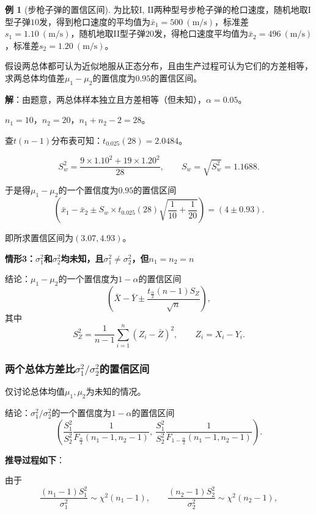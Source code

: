 \documentclass[11pt,a4paper]{report}
\theoremstyle{definition}
\newtheorem{example}{例}[chapter]
\begin{document}
\begin{example}[步枪子弹的置信区间]
为比较I, II两种型号步枪子弹的枪口速度，随机地取I型子弹$10$发，得到枪口速度的平均值为$\bar{x}_{1}=500\ (\text{m/s})$，标准差$s_{1}=1.10\ (\text{m/s})$，随机地取II型子弹$20$发，得枪口速度平均值为$\bar{x}_{2}=496\ (\text{m/s})$，标准差$s_{2}=1.20\ (\text{m/s})$。

假设两总体都可认为近似地服从正态分布，且由生产过程可认为它们的方差相等，求两总体均值差$\mu_{1}-\mu_{2}$的置信度为$0.95$的置信区间。

\textbf{解}：由题意，两总体样本独立且方差相等（但未知），$\alpha=0.05$。

$n_{1}=10$，$n_{2}=20$，$n_{1}+n_{2}-2=28$。

查$t(n-1)$分布表可知：$t_{0.025}(28)=2.0484$。

\[
S_{w}^{2}=\frac{9\times1.10^{2}+19\times1.20^{2}}{28},\qquad S_{w}=\sqrt{S_{w}^{2}}=1.1688.
\]

于是得$\mu_{1}-\mu_{2}$的一个置信度为$0.95$的置信区间
\[
\left(\bar{x}_{1}-\bar{x}_{2}\pm S_{w}\times t_{0.025}(28)\sqrt{\frac{1}{10}+\frac{1}{20}}\right)=(4\pm0.93).
\]

即所求置信区间为$(3.07,4.93)$。
\end{example}

\textbf{情形3：$\sigma_{1}^{2}$和$\sigma_{2}^{2}$均未知，且$\sigma_{1}^{2}\neq\sigma_{2}^{2}$，但$n_{1}=n_{2}=n$}

结论：$\mu_{1}-\mu_{2}$的一个置信度为$1-\alpha$的置信区间
\[
\left(\bar{X}-\bar{Y}\pm\frac{t_{\frac{\alpha}{2}}(n-1)S_{Z}}{\sqrt{n}}\right),
\]
其中
\[
S_{Z}^{2}=\frac{1}{n-1}\sum_{i=1}^{n}\left(Z_{i}-\bar{Z}\right)^{2},\qquad Z_{i}=X_{i}-Y_{i}.
\]

\subsubsection{两个总体方差比\texorpdfstring{$\sigma_{1}^{2}/\sigma_{2}^{2}$}{sigma1^2/sigma2^2}的置信区间}

仅讨论总体均值$\mu_{1},\mu_{2}$为未知的情况。

结论：$\sigma_{1}^{2}/\sigma_{2}^{2}$的一个置信度为$1-\alpha$的置信区间
\[
\left(\frac{S_{1}^{2}}{S_{2}^{2}}\frac{1}{F_{\frac{\alpha}{2}}(n_{1}-1,n_{2}-1)},\ \frac{S_{1}^{2}}{S_{2}^{2}}\frac{1}{F_{1-\frac{\alpha}{2}}(n_{1}-1,n_{2}-1)}\right).
\]

\textbf{推导过程如下}：

由于
\[
\frac{(n_{1}-1)S_{1}^{2}}{\sigma_{1}^{2}}\sim\chi^{2}(n_{1}-1),\qquad \frac{(n_{2}-1)S_{2}^{2}}{\sigma_{2}^{2}}\sim\chi^{2}(n_{2}-1),
\]
\end{document}
